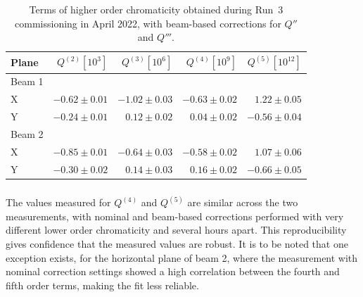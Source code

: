\begin{table}[!htb]
    \centering
    \begin{tabular}{lrrrr}
      \toprule
       Plane          & $Q^{(2)} [10^3]$ & $Q^{(3)} [10^6]$ & $Q^{(4)} [10^9]$ & $Q^{(5)} [10^{12}]$ \\
      \midrule
        Beam 1    &           &          &              &              \\
        \hspace{2mm}X         & $-0.62 \pm 0.01$     & $-1.02 \pm 0.03$ & $-0.63 \pm 0.02$ &$  1.22 \pm 0.05$ \\
        \hspace{2mm}Y         & $-0.24 \pm 0.01$     & $0.12 \pm 0.02 $&  $0.04 \pm 0.02 $& $-0.56 \pm 0.04 $\\
        Beam 2    &           &&&     \\
        \hspace{2mm}X         & $-0.85 \pm 0.01$     & $-0.64 \pm 0.03$ & $-0.58 \pm 0.02$ &$  1.07 \pm 0.06$ \\
        \hspace{2mm}Y         & $-0.30 \pm 0.02$     & $0.14 \pm 0.03 $&  $0.16 \pm 0.02 $& $-0.66 \pm 0.05 $\\
      \bottomrule
    \end{tabular}
    \caption{Terms of higher order chromaticity obtained during Run~3 commissioning in April 2022, with beam-based corrections for $Q''$ and $Q'''$.}
    \label{chroma_table_after}
  \end{table}
  


\subsubsection{}
\label{subsection:q4q5_quality}

The values measured for $Q^{(4)}$ and $Q^{(5)}$ are similar across the two measurements, with nominal and beam-based corrections performed with very different lower order chromaticity and several hours apart.
This reproducibility gives confidence that the measured values are robust.
It is to be noted that one exception exists, for the horizontal plane of beam 2, where the measurement with nominal correction settings showed a high correlation between the fourth and fifth order terms, making the fit less reliable.

